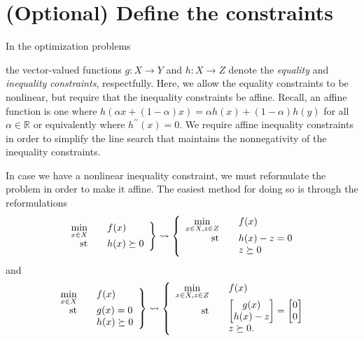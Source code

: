 \documentclass{report}
\newcommand{\re}{\mathbb{R}}
\newcommand{\st}{\textnormal{st}}
\newcommand{\secconstraints}{(Optional) Define the constraints}
\begin{document}
\section{\secconstraints}\label{sec:constraints}
        In the optimization problems
\begin{center}
    \usebox{\boxOptimizationTypes}
\end{center}
\noindent the vector-valued functions $g:X\rightarrow Y$ and $h:X\rightarrow Z$ denote the \textit{equality} and \textit{inequality constraints}, respectfully.  Here, we allow the equality constraints to be nonlinear, but require that the inequality constraints be affine.  Recall, an affine function is one where $h(\alpha x+(1-\alpha)x)=\alpha h(x)+(1-\alpha)h(y)$ for all $\alpha\in\re$ or equivalently where $h^{\prime\prime}(x)=0$.  We require affine inequality constraints in order to simplify the line search that maintains the nonnegativity of the inequality constraints.

        In case we have a nonlinear inequality constraint, we must reformulate the problem in order to make it affine.  The easiest method for doing so is through the reformulations 
$$\left.\begin{array}{rcl}
        \min\limits_{x\in X} && f(x)\\
        \st && h(x)\succeq 0
\end{array}\right\}
\leadsto
\left\{\begin{array}{rcl}
        \min\limits_{x\in X,z\in Z} && f(x)\\
        \st && h(x)-z=0\\
            && z\succeq 0
\end{array}\right.$$
and
$$\left.\begin{array}{rcl}
        \min\limits_{x\in X} && f(x)\\
        \st && g(x)=0\\
            && h(x)\succeq 0
\end{array}\right\}
\leadsto
\left\{\begin{array}{rcl}
        \min\limits_{x\in X,z\in Z} && f(x)\\
        \st && \begin{bmatrix}g(x)\\h(x)-z\end{bmatrix}=\begin{bmatrix}0\\0\end{bmatrix}\\
            && z\succeq 0.
\end{array}\right.$$
\end{document}
